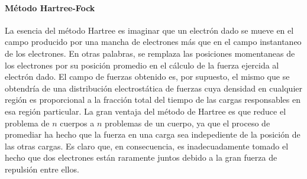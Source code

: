 \paragraph{M\'etodo Hartree-Fock}
La esencia del m\'etodo Hartree es imaginar que un electr\'on dado se 
mueve en el campo producido por una mancha de electrones m\'as que en
el campo instantaneo de los electrones. En otras palabras, se 
remplaza las posiciones momentaneas de los electrones 
por su posici\'on promedio en el c\'alculo de la fuerza ejercida al 
electr\'on dado. El campo de fuerzas obtenido es, por supuesto, el 
mismo que se obtendr\'ia de una distribuci\'on electrost\'atica de 
fuerzas cuya densidad en cualquier regi\'on es proporcional a la 
fracci\'on total del tiempo de las cargas responsables  en esa 
regi\'on particular. La gran ventaja del m\'etodo de Hartree es que 
reduce el problema de $n$ cuerpos a $n$ problemas de un cuerpo, ya 
que el proceso de promediar ha hecho que la fuerza en una carga sea
indepediente de la posici\'on de las otras cargas. Es claro que, en 
consecuencia, es inadecuadamente tomado el hecho que dos electrones
est\'an raramente juntos debido a la gran fuerza de repulsi\'on entre
ellos. 
